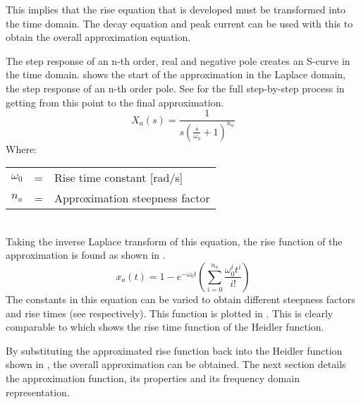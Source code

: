 This implies that the rise equation that is developed must be transformed into the time domain. The decay equation and peak current can be used with this to obtain the overall approximation equation.

The step response of an n-th order, real and negative pole creates an S-curve in the time domain.  shows the start of the approximation in the Laplace domain, the step response of an n-th order pole. See  for the full step-by-step process in getting from this point to the final approximation.
\begin{equation}
    X_a \left( s \right) = \frac{1}{s \left ( \frac{s}{\omega_0} +1 \right )^{n_a}}
    \label{eqn:approxRiseLaplace}
\end{equation}
Where: \\
\begin{tabular}{cll}
    $\omega_0$ & = & Rise time constant [rad/s] \\
    $n_a$ & = & Approximation steepness factor
\end{tabular}\\

Taking the inverse Laplace transform of this equation, the rise function of the approximation is found as shown in .
\begin{equation}
    x_a \left( t \right) = 1 - e^{-\omega_0 t} \left ( \sum\limits_{i=0}^{n_a} \frac{\omega_0^i t^i}{i!} \right )
    \label{eqn:approxRise}
\end{equation}
The constants in this equation can be varied to obtain different steepness factors and rise times (see  respectively). This function is plotted in . This is clearly comparable to  which shows the rise time function of the Heidler function.

By substituting the approximated rise function back into the Heidler function shown in , the overall approximation can be obtained. The next section details the approximation function, its properties and its frequency domain representation.


